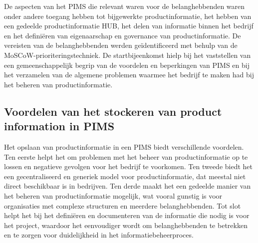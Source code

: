 De aspecten van het PIMS die relevant waren voor de belanghebbenden waren onder andere toegang hebben tot bijgewerkte productinformatie, het hebben van een gedeelde productinformatie HUB, het delen van informatie binnen het bedrijf en het definiëren van eigenaarschap en governance van productinformatie. De vereisten van de belanghebbenden werden geïdentificeerd met behulp van de MoSCoW-prioriteringstechniek. De startbijeenkomst hielp bij het vaststellen van een gemeenschappelijk begrip van de voordelen en beperkingen van PIMS en bij het verzamelen van de algemene problemen waarmee het bedrijf te maken had bij het beheren van productinformatie.
\autocite{Battistello2021}

\subsection{Voordelen van het stockeren van product information in PIMS}
\label{Voordelen van het stockeren van product information in PIMS}

Het opslaan van productinformatie in een PIMS biedt verschillende voordelen. Ten eerste helpt het om problemen met het beheer van productinformatie op te lossen en negatieve gevolgen voor het bedrijf te voorkomen. Ten tweede biedt het een gecentraliseerd en generiek model voor productinformatie, dat meestal niet direct beschikbaar is in bedrijven. Ten derde maakt het een gedeelde manier van het beheren van productinformatie mogelijk, wat vooral gunstig is voor organisaties met complexe structuren en meerdere belanghebbenden. Tot slot helpt het bij het definiëren en documenteren van de informatie die nodig is voor het project, waardoor het eenvoudiger wordt om belanghebbenden te betrekken en te zorgen voor duidelijkheid in het informatiebeheerproces.
\autocite{Battistello2021}

